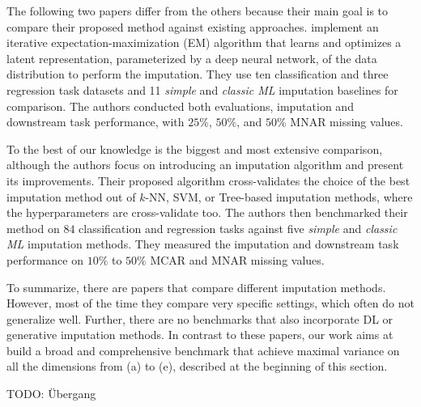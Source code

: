 The following two papers differ from the others because their main goal is to compare their proposed method against existing approaches. \cite{Imputation_Benchmark_6} implement an iterative expectation-maximization (EM) algorithm that learns and optimizes a latent representation, parameterized by a deep neural network, of the data distribution to perform the imputation. They use ten classification and three regression task datasets and 11 \emph{simple} and \emph{classic ML} imputation baselines for comparison. The authors conducted both evaluations, imputation and downstream task performance, with $25\%$, $50\%$, and $50\%$ MNAR missing values.

To the best of our knowledge \citep{Imputation_Benchmark_4} is the biggest and most extensive comparison, although the authors focus on introducing an imputation algorithm and present its improvements. Their proposed algorithm cross-validates the choice of the best imputation method out of $k$-NN, SVM, or Tree-based imputation methods, where the hyperparameters are cross-validate too. The authors then benchmarked their method on $84$ classification and regression tasks against five \emph{simple} and \emph{classic ML} imputation methods. They measured the imputation and downstream task performance on $10\%$ to $50\%$ MCAR and MNAR missing values.

To summarize, there are papers that compare different imputation methods. However, most of the time they compare very specific settings, which often do not generalize well. Further, there are no benchmarks that also incorporate DL or generative imputation methods. In contrast to these papers, our work aims at build a broad and comprehensive benchmark that achieve maximal variance on all the dimensions from (a) to (e), described at the beginning of this section.

TODO: Übergang

